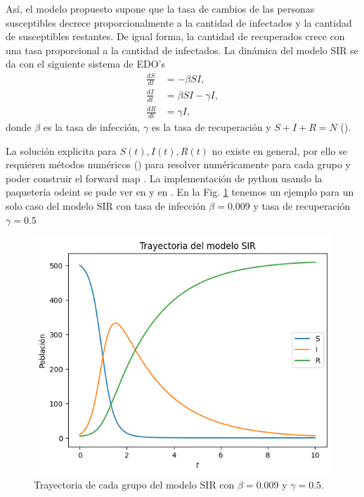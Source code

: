 Así, el modelo propuesto supone que la tasa de cambios de las personas susceptibles decrece proporcionalmente a la cantidad de infectados y la cantidad de susceptibles restantes. De igual forma, la cantidad de recuperados crece con una tasa proporcional a la cantidad de infectados. La dinámica del modelo SIR se da con el siguiente sistema de EDO's
\begin{align}
    \frac{dS}{dt} &= -\beta S I, \nonumber \\
    \frac{dI}{dt} &= \beta S I - \gamma I,\\
    \frac{dR}{dt} &= \gamma I, \nonumber
\end{align}
donde $\beta$ es la tasa de infección, $\gamma$ es la tasa de recuperación y $S + I + R = N$ (\cite{weiss2013sir}).

La solución explicita para $S(t), I(t), R(t)$ no existe en general, por ello se requieren métodos numéricos (\cite{mathews2000metodos}) para resolver numéricamente para cada grupo y poder construir el forward map . La implementación de python usando la paquetería odeint se pude ver en \cite{jimenez2022metodos} y en \cite{griffiths2010numerical}. En la Fig. \ref{fig:trayectoria_SIR} tenemos un ejemplo para un solo caso del modelo SIR con tasa de infección $\beta = 0.009$ y tasa de recuperación $\gamma = 0.5$


\begin{figure}
    \centering
    \includegraphics[width = 10 cm]{img/trayectoria_SIR.png}
    \caption{Trayectoria de cada grupo del modelo SIR con $\beta = 0.009$ y $\gamma = 0.5$.}
    \label{fig:trayectoria_SIR}
\end{figure}




